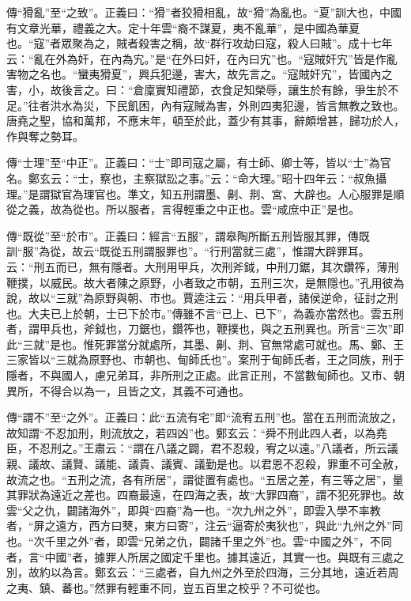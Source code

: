 {\noindent\zhuan{}\fzbyks 傳“猾亂”至“之致”。正義曰：“猾”者狡猾相亂，故“猾”為亂也。“夏”訓大也，中國有文章光華，禮義之大。定十年雲“裔不謀夏，夷不亂華”，是中國為華夏也。“寇”者眾聚為之，賊者殺害之稱，故“群行攻劫曰寇，殺人曰賊”。成十七年云：“亂在外為奸，在內為宄。”是“在外曰奸，在內曰宄”也。“寇賊奸宄”皆是作亂害物之名也。“蠻夷猾夏”，興兵犯邊，害大，故先言之。“寇賊奸宄”，皆國內之害，小，故後言之。曰：“倉廩實知禮節，衣食足知榮辱，讓生於有餘，爭生於不足。”往者洪水為災，下民飢困，內有寇賊為害，外則四夷犯邊，皆言無教之致也。唐堯之聖，協和萬邦，不應末年，頓至於此，蓋少有其事，辭頗增甚，歸功於人，作與奪之勢耳。 \par}

{\noindent\zhuan{}\fzbyks 傳“士理”至“中正”。正義曰：“士”即司寇之屬，有士師、卿士等，皆以“士”為官名。鄭玄云：“士，察也，主察獄訟之事。”云：“命大理。”昭十四年云：“叔魚攝理。”是謂獄官為理官也。準文，知五刑謂墨、劓、剕、宮、大辟也。人心服罪是順從之義，故為從也。所以服者，言得輕重之中正也。雲“咸庶中正”是也。 \par}

{\noindent\zhuan{}\fzbyks 傳“既從”至“於市”。正義曰：經言“五服”，謂皋陶所斷五刑皆服其罪，傳既訓“服”為從，故云“既從五刑謂服罪也”。“行刑當就三處”，惟謂大辟罪耳。云：“刑五而已，無有隱者。大刑用甲兵，次刑斧鉞，中刑刀鋸，其次鑽筰，薄刑鞭撲，以威民。故大者陳之原野，小者致之市朝，五刑三次，是無隱也。”孔用彼為說，故以“三就”為原野與朝、市也。賈逵注云：“用兵甲者，諸侯逆命，征討之刑也。大夫已上於朝，士已下於市。”傳雖不言“已上、已下”，為義亦當然也。雲五刑者，謂甲兵也，斧鉞也，刀鋸也，鑽筰也，鞭撲也，與之五刑異也。所言“三次”即此“三就”是也。惟死罪當分就處所，其墨、劓、剕、官無常處可就也。馬、鄭、王三家皆以“三就為原野也、市朝也、甸師氏也”。案刑于甸師氏者，王之同族，刑于隱者，不與國人，慮兄弟耳，非所刑之正處。此言正刑，不當數甸師也。又市、朝異所，不得合以為一，且皆之文，其義不可通也。 \par}

{\noindent\zhuan{}\fzbyks 傳“謂不”至“之外”。正義曰：此“五流有宅”即“流宥五刑”也。當在五刑而流放之，故知謂“不忍加刑，則流放之，若四凶”也。鄭玄云：“舜不刑此四人者，以為堯臣，不忍刑之。”王肅云：“謂在八議之闢，君不忍殺，宥之以遠。”八議者，所云議親、議故、議賢、議能、議貴、議賓、議勤是也。以君恩不忍殺，罪重不可全赦，故流之也。“五刑之流，各有所居”，謂徙置有處也。“五居之差，有三等之居”，量其罪狀為遠近之差也。四裔最遠，在四海之表，故“大罪四裔”，謂不犯死罪也。故雲“父之仇，闢諸海外”，即與“四裔”為一也。“次九州之外”，即雲入學不率教者，“屏之遠方，西方曰僰，東方曰寄”，注云“逼寄於夷狄也”，與此“九州之外”同也。“次千里之外”者，即雲“兄弟之仇，闢諸千里之外”也。雲“中國之外”，不同者，言“中國”者，據罪人所居之國定千里也。據其遠近，其實一也。與既有三處之別，故約以為言。鄭玄云：“三處者，自九州之外至於四海，三分其地，遠近若周之夷、鎮、蕃也。”然罪有輕重不同，豈五百里之校乎？不可從也。 \par}

